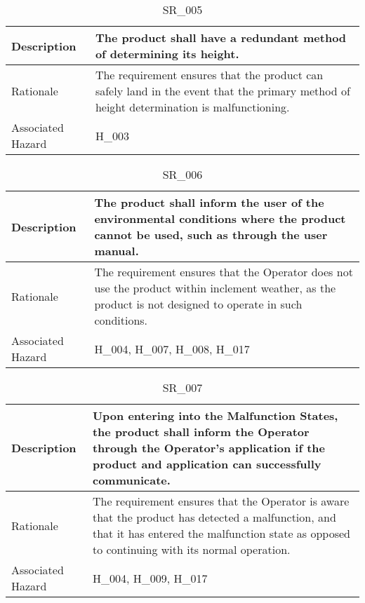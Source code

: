 \documentclass{article}
\begin{document}
\begin{table}[!h]
\begin{center}
\caption {SR\_005} 
\label{SR_005}
\begin{tabular}{ | m{3cm} | m{11cm} | }
\hline
Description & The product shall have a redundant method of determining its height.
 \\
\hline
Rationale & The requirement ensures that the product can safely land in the event that the primary method of height determination is malfunctioning. \\
\hline
Associated Hazard & H\_003 \\
\hline
\end{tabular}
\end{center}
\end{table}

\begin{table}[!h]
\begin{center}
\caption {SR\_006} 
\label{SR_006}
\begin{tabular}{ | m{3cm} | m{11cm} | }
\hline
Description & The product shall inform the user of the environmental conditions where the product cannot be used, such as through the user manual. \\
\hline
Rationale & The requirement ensures that the Operator does not use the product within inclement weather, as the product is not designed to operate in such conditions. \\
\hline
Associated Hazard & H\_004, H\_007, H\_008, H\_017 \\
\hline
\end{tabular}
\end{center}
\end{table}

\begin{table}[!h]
\begin{center}
\caption {SR\_007} 
\label{SR_007}
\begin{tabular}{ | m{3cm} | m{11cm} | }
\hline
Description & Upon entering into the Malfunction States, the product shall inform the Operator through the Operator's application if the product and application can successfully communicate. \\
\hline
Rationale & The requirement ensures that the Operator is aware that the product has detected a malfunction, and that it has entered the malfunction state as opposed to continuing with its normal operation. \\
\hline
Associated Hazard & H\_004, H\_009, H\_017 \\
\hline
\end{tabular}
\end{center}
\end{table}
\end{document}
